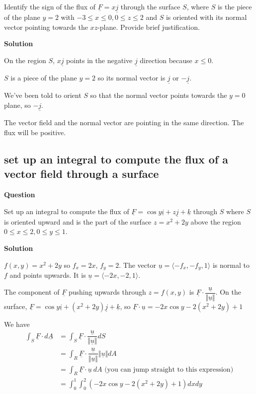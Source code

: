\documentclass[12pt,letterpaper,noanswers]{exam}
\newcommand{\mb}[1]{\underline{#1}}
\begin{document}
Identify the sign of the flux of $\mb F = x\mb j$ through the surface $S$, where $S$ is the piece of the plane $y = 2$ with $-3\leq x \leq 0, 0\leq z\leq 2$ and $S$ is oriented with its normal vector pointing towards the $xz$-plane.  Provide brief justification.

\noindent\textbf{Solution}


On the region $S$, $x\mb j$ points in the negative $\mb j$ direction because $x \leq 0$.

$S$ is a piece of the plane $y = 2$ so its normal vector is $\mb j$ or $-\mb j$.

We've been told to orient $S$ so that the normal vector points towards the $y = 0$ plane, so $-\mb j$.

The vector field and the normal vector are pointing in the same direction.  The flux will be positive.

\subsection{set up an integral to compute the flux of a vector field through a surface}
\noindent\textbf{Question}

Set up an integral to compute the flux of $\mb F = \cos y\mb i + z\mb j + \mb k$ through $S$ where $S$ is oriented upward and is the part of the surface $z = x^2+2y$ above the region $0\leq x\leq 2, 0\leq y\leq 1$.

\noindent\textbf{Solution}

$f(x,y) = x^2+2y$ so $f_x = 2x$, $f_y = 2$.  The vector $\mb u = \langle -f_x, -f_y, 1\rangle$ is normal to $f$ and points upwards.  It is $\mb u = \langle -2x, -2, 1\rangle$.

The component of $\mb F$ pushing upwards through $z = f(x,y)$ is $\mb F \cdot \dfrac{\mb u}{\Vert \mb u \Vert}$.  On the surface, $\mb F = \cos y\mb i + (x^2+2y)\mb j + \mb k$, so $\mb F\cdot \mb u = -2x\cos y -2(x^2+2y) + 1$



We have 
\begin{align*}
\int_S \mb F\cdot d\mb A &= \int_S \mb F \cdot \dfrac{\mb u}{\Vert \mb u\Vert}dS \\
&= \int_R \mb F \cdot \dfrac{\mb u}{\Vert \mb u\Vert} \Vert\mb u\Vert dA \\
&= \int_R \mb F \cdot \mb u\ dA \text{ (you can jump straight to this expression)}\\
&= \int_0^1 \int_0^2 (-2x\cos y -2(x^2+2y) + 1) dx dy
\end{align*}
\end{document}
